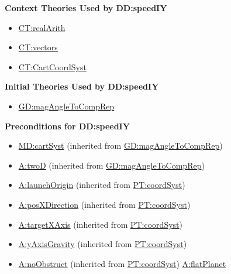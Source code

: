 \documentclass[12pt]{article}
\begin{document}
\noindent \textbf{Context Theories Used by DD:speedIY}

\begin{itemize}
\item \hyperref[CT:realArith]{CT:realArith}
\item \hyperref[CT:vectors]{CT:vectors}
\item \hyperref[CT:CartCoordSyst]{CT:CartCoordSyst}
\end{itemize}

\noindent \textbf{Initial Theories Used by DD:speedIY}

\begin{itemize}
\item \hyperref[GD:magAngleToCompRep]{GD:magAngleToCompRep}
\end{itemize}

\noindent \textbf{Preconditions for DD:speedIY}

\begin{itemize}
\item \hyperref[MD:cartSyst]{MD:cartSyst} (inherited from \hyperref[GD:magAngleToCompRep]{GD:magAngleToCompRep})
\item \hyperref[twoD]{A:twoD} (inherited from \hyperref[GD:magAngleToCompRep]{GD:magAngleToCompRep})
\item \hyperref[launchOrigin]{A:launchOrigin} (inherited from \hyperref[PT:coordSyst]{PT:coordSyst})
\item \hyperref[posXDirection]{A:posXDirection} (inherited from \hyperref[PT:coordSyst]{PT:coordSyst})
\item \hyperref[targetXAxis]{A:targetXAxis} (inherited from \hyperref[PT:coordSyst]{PT:coordSyst})
\item \hyperref[yAxisGravity]{A:yAxisGravity} (inherited from \hyperref[PT:coordSyst]{PT:coordSyst})
\item \hyperref[noObstruct]{A:noObstruct} (inherited from \hyperref[PT:coordSyst]{PT:coordSyst})
\hyperref[flatPlanet]{A:flatPlanet}
\end{itemize}
\end{document}
